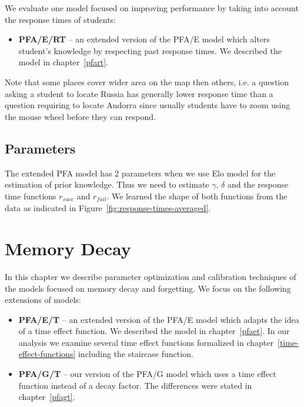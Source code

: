 We evaluate one model focused on improving performance by taking into account the response times of students:

\begin{itemize}
  \item \textbf{PFA/E/RT} -- an extended version of the PFA/E model which alters student's knowledge by respecting past response times. We described the model in chapter~\ref{pfart}.
\end{itemize}

Note that some places cover wider area on the map then others, i.e. a question asking a student to locate Russia has generally lower response time than a question requiring to locate Andorra since usually students have to zoom using the mouse wheel before they can respond.

\subsection{Parameters}
\label{response-parameters}

The extended PFA model has 2 parameters when we use Elo model for the estimation of prior knowledge. Thus we need to estimate $\gamma$, $\delta$ and the response time functions $r_{\mathit{succ}}$ and $r_{\mathit{fail}}$. We learned the shape of both functions from the data as indicated in Figure~\ref{fig:response-times-averaged}.

\section{Memory Decay}

In this chapter we describe parameter optimization and calibration techniques of the models focused on memory decay and forgetting. We focus on the following extensions of models:

\begin{itemize}
  \item \textbf{PFA/E/T} -- an extended version of the PFA/E model which adapts the idea of a time effect function. We described the model in chapter~\ref{pfaet}. In our analysis we examine several time effect functions formalized in chapter~\ref{time-effect-functions} including the staircase function.
  \item \textbf{PFA/G/T} -- our version of the PFA/G model which uses a time effect function instead of a decay factor. The differences were stated in chapter~\ref{pfagt}.
\end{itemize}

